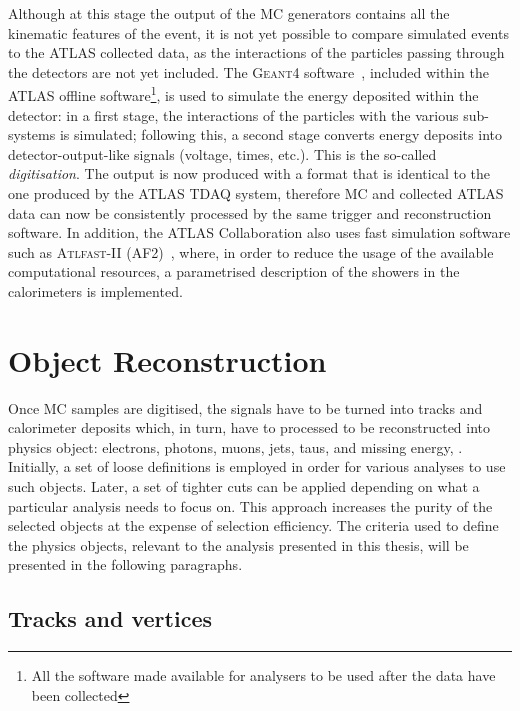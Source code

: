 			Although at this stage the output of the \ac{MC} generators contains all the kinematic features of the event, it is not yet possible to compare simulated events to the \ac{ATLAS} collected data, as the interactions of the particles passing through the detectors are not yet included. The \textsc{Geant4} software~\cite{Geant42003}, included within the \ac{ATLAS} offline software\footnote{All the software made available for analysers to be used after the data have been collected}, is used to simulate the energy deposited within the detector: in a first stage, the interactions of the particles with the various sub-systems is simulated; following this, a second stage converts energy deposits into detector-output-like signals (voltage, times, etc.). This is the so-called \emph{digitisation}. The output is now produced with a format that is identical to the one produced by the \ac{ATLAS} \ac{TDAQ} system, therefore \ac{MC} and collected \ac{ATLAS} data can now be consistently processed by the same trigger and reconstruction software. In addition, the \ac{ATLAS} Collaboration also uses fast simulation software such as \textsc{Atlfast-II} (AF2)~\cite{Lukas2012}, where, in order to reduce the usage of the available computational resources, a parametrised description of the showers in the calorimeters is implemented. 


	\section{Object Reconstruction}
	\label{sec:objReco}

		Once \ac{MC} samples are digitised, the signals have to be turned into tracks and calorimeter deposits which, in turn, have to processed to be reconstructed into physics object: electrons, photons, muons, jets, taus, and missing energy, \met. Initially, a set of loose definitions is employed in order for various analyses to use such objects. Later, a set of tighter cuts can be applied depending on what a particular analysis needs to focus on. This approach increases the purity of the selected objects at the expense of selection efficiency. The criteria used to define the physics objects, relevant to the analysis presented in this thesis, will be presented in the following paragraphs.


		\subsection*{Tracks and vertices}

